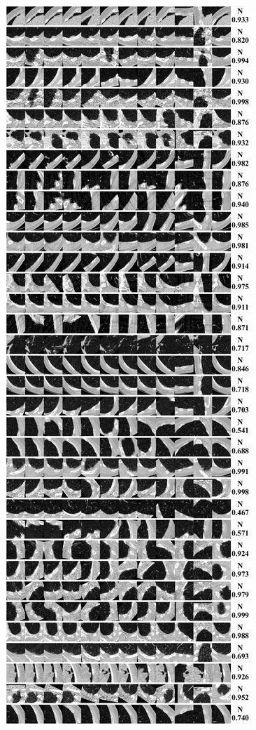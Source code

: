 \documentclass[onecolumn]{IEEEtran}
\begin{document}
\begin{figure}[H]
{\includegraphics[width=0.45\columnwidth]{./images/elcap-nodules-nonnodule3}
}
\end{figure}
\newpage
\end{document}
